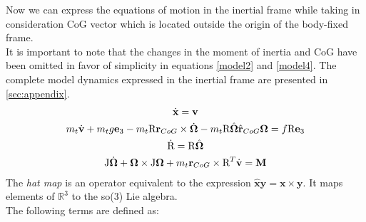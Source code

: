 Now we can express the equations of motion in the inertial frame while taking in consideration CoG vector which is located outside the origin of the body-fixed frame\cite{LeeModel}. \\
It is important to note that the changes in the moment of inertia and CoG have been omitted in favor of simplicity in equations \eqref{model2} and \eqref{model4}. The complete model dynamics{\tiny } expressed in the inertial frame are presented in \ref{sec:appendix}.
\begin{gather}
	\dot{\textbf{x}} = \textbf{v} \label{model1}\\
	m_t\dot{\textbf{v}} + m_tg\textbf{e}_3 - m_t\text{R}  \textbf{r}_{CoG} \times \dot{\boldsymbol{\Omega}} - m_t\text{R}\hat{\boldsymbol{\Omega}}\hat{ \textbf{r}}_{CoG}\boldsymbol{\Omega} = f\text{R}\textbf{e}_3 \label{model2} \\
	\dot{\text{R}} = \text{R}\hat{\boldsymbol{\Omega}} \label{model3} \\
	\text{J} \dot{\boldsymbol{\Omega}} + \boldsymbol{\Omega} \times \text{J} \boldsymbol{\Omega} + m_t  \textbf{r}_{CoG} \times \text{R}^T \dot{\textbf{v}} = \textbf{M} \label{model4}
\end{gather}
The \textit{hat map} is an operator equivalent to the expression $\hat{\textbf{x}}\textbf{y} = \textbf{x} \times \textbf{y}$. It maps elements of $\mathbb{R}^3$ to the so(3) Lie algebra. \\
\noindent The following terms are defined as:

